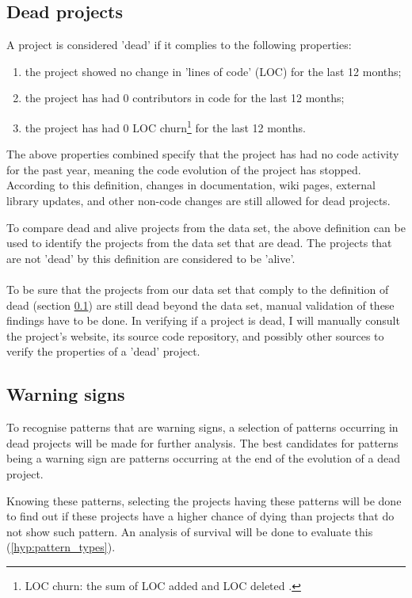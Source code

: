 \subsection{Dead projects}
\label{def:dead}
A project is considered 'dead' if it complies to the following properties:
\begin{enumerate}
	\item the project showed no change in 'lines of code' (LOC) for the last 12
	months;
	\item the project has had 0 contributors in code for the last 12 months;
	\item the project has had 0 LOC churn\footnote{LOC churn: the sum of LOC added
	and LOC deleted \cite{elbaum}.} for the last 12 months.
\end{enumerate}

\noindent
The above properties combined specify that the project has had no code activity
for the past year, meaning the code evolution of the project has stopped.
According to this definition, changes in documentation, wiki pages, external
library updates, and other non-code changes are still allowed for dead
projects.

To compare dead and alive projects from the data set, the above definition can
be used to identify the projects from the data set that are dead. The projects
that are not 'dead' by this definition are considered to be 'alive'.

\paragraph{}
To be sure that the projects from our data set that comply to the definition of
dead (section \ref{def:dead}) are still dead beyond the data set, manual
validation of these findings have to be done. In verifying if a project is
dead, I will manually consult the project's website, its source code
repository, and possibly other sources to verify the properties of a 'dead'
project.

\subsection{Warning signs}
To recognise patterns that are warning signs, a selection of patterns occurring
in dead projects will be made for further analysis. The best candidates for
patterns being a warning sign are patterns occurring at the end of the
evolution of a dead project.

Knowing these patterns, selecting the projects having these patterns will be
done to find out if these projects have a higher chance of dying than projects
that do not show such pattern. An analysis of survival will be done to evaluate
this (\ref{hyp:pattern_types}).

